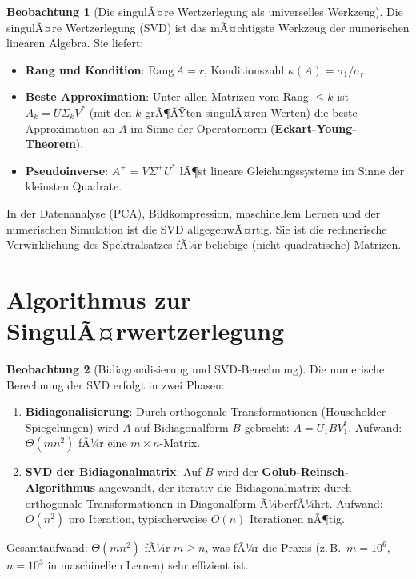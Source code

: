 ﻿\documentclass[a4paper,12pt]{report}
\theoremstyle{definition}
\newtheorem{beobachtung}{Beobachtung}
\begin{document}
\begin{beobachtung}[Die singulÃ¤re Wertzerlegung als universelles Werkzeug]
    Die singulÃ¤re Wertzerlegung (SVD) ist das mÃ¤chtigste Werkzeug der
    numerischen linearen Algebra. Sie liefert:
    \begin{itemize}
        \item[-] \textbf{Rang und Kondition}: $\mathrm{Rang}\, A = r$,
              Konditionszahl $\kappa(A) = \sigma_1 / \sigma_r$.
        \item[-] \textbf{Beste Approximation}: Unter allen Matrizen
              vom Rang $\leq k$ ist $A_k = U \Sigma_k V^*$ (mit den
              $k$ grÃ¶ÃŸten singulÃ¤ren Werten) die beste Approximation
              an $A$ im Sinne der Operatornorm (\textbf{Eckart-Young-Theorem}).
        \item[-] \textbf{Pseudoinverse}: $A^+ = V \Sigma^+ U^*$ lÃ¶st
              lineare Gleichungssysteme im Sinne der kleinsten Quadrate.
    \end{itemize}
    In der Datenanalyse (PCA), Bildkompression, maschinellem Lernen und
    der numerischen Simulation ist die SVD allgegenwÃ¤rtig. Sie ist die
    rechnerische Verwirklichung des Spektralsatzes fÃ¼r beliebige
    (nicht-quadratische) Matrizen.
\end{beobachtung}


\section{Algorithmus zur SingulÃ¤rwertzerlegung}

\begin{beobachtung}[Bidiagonalisierung und SVD-Berechnung]
    Die numerische Berechnung der SVD erfolgt in zwei Phasen:
    \begin{enumerate}
        \item \textbf{Bidiagonalisierung}: Durch orthogonale
              Transformationen (Householder-Spiege\-lungen) wird $A$
              auf Bidiagonalform $B$ gebracht: $A = U_1 B V_1^t$.
              Aufwand: $\Theta(mn^2)$ fÃ¼r eine $m \times n$-Matrix.
        \item \textbf{SVD der Bidiagonalmatrix}: Auf $B$ wird der
              \textbf{Golub-Reinsch-Algorithmus} angewandt, der
              iterativ die Bidiagonalmatrix durch orthogonale
              Transformationen in Diagonalform Ã¼berfÃ¼hrt.
              Aufwand: $O(n^2)$ pro Iteration, typischerweise
              $O(n)$ Iterationen nÃ¶tig.
    \end{enumerate}
    Gesamtaufwand: $\Theta(mn^2)$ fÃ¼r $m \geq n$, was fÃ¼r die
    Praxis (z.\,B.\ $m = 10^6$, $n = 10^3$ in maschinellen Lernen)
    sehr effizient ist.
\end{beobachtung}
\end{document}
